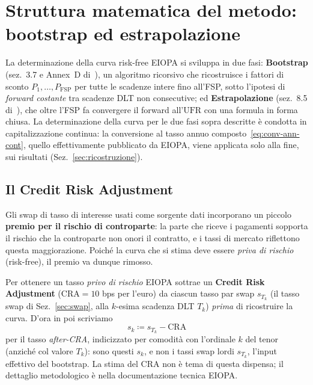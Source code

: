 \documentclass[11pt,a4paper]{article}
\theoremstyle{plain}
\theoremstyle{definition}
\theoremstyle{remark}
\newcommand{\UFR}{\mathrm{UFR}}
\newcommand{\FSP}{\mathrm{FSP}}
\newcommand{\CRA}{\mathrm{CRA}}
\newcommand{\defeq}{\coloneqq}
\begin{document}
\section{Struttura matematica del metodo: bootstrap ed estrapolazione}
\label{sec:metodo}

La determinazione della curva risk-free EIOPA si sviluppa in due fasi: \textbf{Bootstrap}
(sez.~3.7 e Annex~D di~\cite{eiopa2026}), un algoritmo ricorsivo che ricostruisce i fattori di
sconto $P_1,\ldots,P_{\FSP}$ per tutte le scadenze intere fino all'FSP, sotto l'ipotesi di
\emph{forward costante} tra scadenze DLT non consecutive; ed \textbf{Estrapolazione}
(sez.~8.5 di~\cite{eiopa2026}), che oltre l'FSP fa convergere il forward all'$\UFR$ con una formula in forma
chiusa. La determinazione della curva per le due fasi sopra descritte \`e condotta in capitalizzazione continua: la conversione al
tasso annuo composto~\eqref{eq:conv-ann-cont}, quello effettivamente pubblicato da EIOPA,
viene applicata solo alla fine, sui risultati (Sez.~\ref{sec:ricostruzione}).

\subsection{Il Credit Risk Adjustment}
\label{sec:cra}

Gli swap di tasso di interesse usati come sorgente dati incorporano un piccolo \textbf{premio
per il rischio di controparte}: la parte che riceve i pagamenti sopporta il rischio che la
controparte non onori il contratto, e i tassi di mercato riflettono questa maggiorazione.
Poich\'e la curva che si stima deve essere \emph{priva di rischio} (risk-free), il premio va dunque
rimosso.

Per ottenere un tasso \emph{privo di rischio} EIOPA sottrae un \textbf{Credit Risk
Adjustment} ($\CRA = 10$ bps per l'euro) da ciascun tasso par swap $s_{T_k}$ (il tasso swap di
Sez.~\ref{sec:swap}, alla $k$-esima scadenza DLT $T_k$) \emph{prima} di ricostruire la curva.
D'ora in poi scriviamo
\begin{equation}
  \label{eq:cra-def}
  s_k \defeq s_{T_k} - \CRA
\end{equation}
per il tasso \emph{after-CRA}, indicizzato per comodit\`a con l'ordinale $k$ del tenor
(anzich\'e col valore $T_k$): sono questi $s_k$, e non i tassi swap lordi $s_{T_k}$, l'input
effettivo del bootstrap. La stima del $\CRA$ non \`e tema di questa dispensa; il dettaglio
metodologico \`e nella documentazione tecnica EIOPA.
\end{document}
